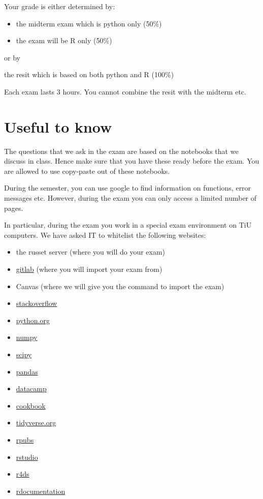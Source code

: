\documentclass[]{book}
\providecommand{\tightlist}{%
  \setlength{\itemsep}{0pt}\setlength{\parskip}{0pt}}
\begin{document}
Your grade is either determined by:

\begin{itemize}
\tightlist
\item
  the midterm exam which is python only (50\%)
\item
  the exam will be R only (50\%)
\end{itemize}

or by

the resit which is based on both python and R (100\%)

Each exam lasts 3 hours. You cannot combine the resit with the midterm etc.

\hypertarget{useful-to-know}{%
\section{Useful to know}\label{useful-to-know}}

The questions that we ask in the exam are based on the notebooks that we discuss in class. Hence make sure that you have these ready before the exam. You are allowed to use copy-paste out of these notebooks.

During the semester, you can use google to find information on functions, error messages etc. However, during the exam you can only access a limited number of pages.

In particular, during the exam you work in a special exam environment on TiU computers. We have asked IT to whitelist the following websites:

\begin{itemize}
\tightlist
\item
  the russet server (where you will do your exam)
\item
  \href{gitlab.uvt.nl}{gitlab} (where you will import your exam from)
\item
  Canvas (where we will give you the command to import the exam)
\item
  \href{https://stackoverflow.com/}{stackoverflow}
\item
  \href{https://www.python.org/}{python.org}
\item
  \href{http://www.numpy.org/}{numpy}
\item
  \href{https://www.scipy.org/}{scipy}
\item
  \href{https://pandas.pydata.org/}{pandas}
\item
  \href{https://www.datacamp.com/home}{datacamp}
\item
  \href{http://www.cookbook-r.com/}{cookbook}
\item
  \href{https://dplyr.tidyverse.org/}{tidyverse.org}
\item
  \href{https://rpubs.com/}{rpubs}
\item
  \href{https://www.rstudio.com/}{rstudio}
\item
  \href{https://r4ds.had.co.nz/}{r4ds}
\item
  \href{https://www.rdocumentation.org/}{rdocumentation}
\end{itemize}
\end{document}

